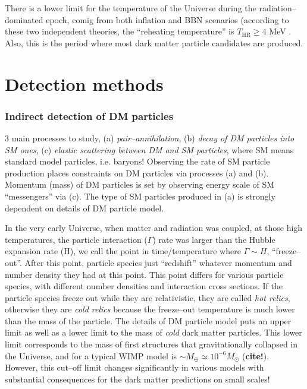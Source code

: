 \documentclass[paper=a4, fontsize=11pt]{scrartcl} %
\numberwithin{equation}{section} %
\numberwithin{figure}{section} %
\numberwithin{table}{section} %
\begin{document}
There is a lower limit for the temperature of the Universe during the radiation--dominated epoch, comig from both inflation and BBN scenarios (according to these two independent theories, the ``reheating temperature'' is $T_\mathrm{HR} \geq 4$ MeV \citep[ref. 10 in lecturenotes!][]{}. Also, this is the period where most dark matter particle candidates are produced.

\section{Detection methods}
\subsubsection*{Indirect detection of DM particles}
3 main processes to study, (a) \emph{pair--annihilation}, (b) \emph{decay of DM particles into SM ones}, (c) \emph{elastic scattering between DM and SM particles}, where SM means standard model particles, i.e. baryons!
Observing the rate of SM particle production places constraints on DM particles via processes (a) and (b).
Momentum (mass) of DM particles is set by observing energy scale of SM ``messengers'' via (c).
The type of SM particles produced in (a) is strongly dependent on details of DM particle model.

In the very early Universe, when matter and radiation was coupled, at those high temperatures, the particle interaction ($\Gamma$) rate was larger than the Hubble expansion rate (H), we call the point in time/temperature where $\Gamma \sim H$, ``freeze--out''. After this point, particle species just ``redshift'' whatever momentum and number density they had at this point. This point differs for various particle species, with different number densities and interaction cross sections. If the particle species freeze out while they are relativistic, they are called \emph{hot relics}, otherwise they are \emph{cold relics} because the freeze--out temperature is much lower than the mass of the particle. The details of DM particle model puts an upper limit as well as a lower limit to the mass of \emph{cold} dark matter particles. This lower limit corresponds to the mass of first structures that gravitationally collapsed in the Universe, and for a typical WIMP model is $\sim M_\oplus \simeq 10^{-6} M_\odot$ ({\bf cite!}). However, this cut--off limit changes significantly in various models with substantial consequences for the dark matter predictions on small scales! 
\end{document}
